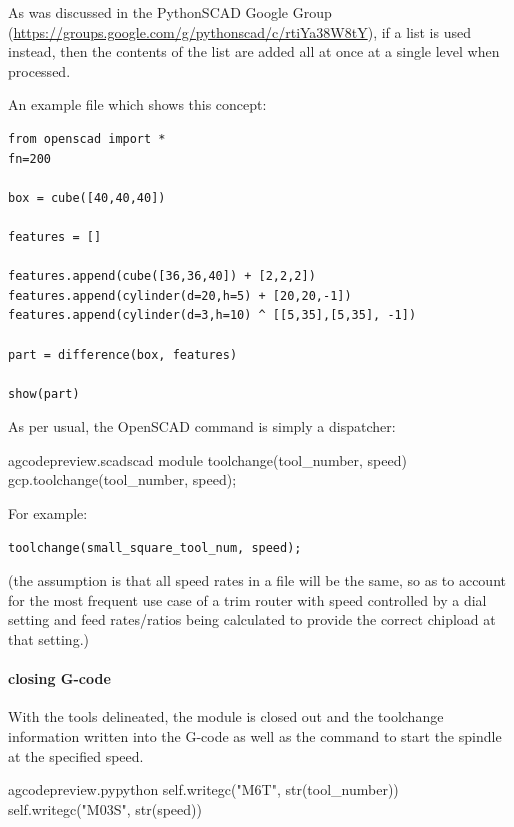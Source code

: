 \documentclass{ltxdoc}
\begin{document}
As was discussed in the PythonSCAD Google Group (\url{https://groups.google.com/g/pythonscad/c/rtiYa38W8tY}), if a list is used instead, then the contents of the list are added all at once at a single level when processed.

An example file which shows this concept:

\begin{verbatim}
from openscad import *
fn=200

box = cube([40,40,40])

features = []

features.append(cube([36,36,40]) + [2,2,2])
features.append(cylinder(d=20,h=5) + [20,20,-1])
features.append(cylinder(d=3,h=10) ^ [[5,35],[5,35], -1])

part = difference(box, features)

show(part)

\end{verbatim}

As per usual, the OpenSCAD command is simply a dispatcher:

\lstset{firstnumber=\thegcpscad}
\begin{writecode}{a}{gcodepreview.scad}{scad}
module toolchange(tool_number, speed){
    gcp.toolchange(tool_number, speed);
}

\end{writecode}
\addtocounter{gcpscad}{4}

\noindent For example:

\begin{verbatim}
toolchange(small_square_tool_num, speed);
\end{verbatim}

\noindent (the assumption is that all speed rates in a file will be the same, so as to account for the most frequent use case of a trim router with speed controlled by a dial setting and feed rates/ratios being calculated to provide the correct chipload at that setting.)

\paragraph{closing G-code}

With the tools delineated, the module is closed out and the toolchange information written into the G-code as well as the command to start the spindle at the specified speed.
 
\lstset{firstnumber=\thegcpy}
\begin{writecode}{a}{gcodepreview.py}{python}
        self.writegc("M6T", str(tool_number))
        self.writegc("M03S", str(speed))

\end{writecode}
\addtocounter{gcpy}{3}
\end{document}
